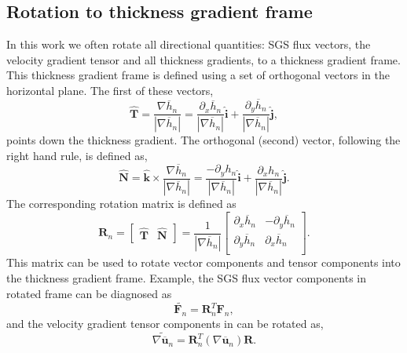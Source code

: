 \documentclass[draft,ms]{agutexSI2019}
\begin{document}
\begin{article}
\section{Rotation to thickness gradient frame}
\label{app:frame_rotate}
In this work we often rotate all directional quantities: SGS flux vectors, the velocity gradient tensor and all thickness gradients, to a thickness gradient frame. 
This thickness gradient frame is defined using a set of orthogonal vectors in the horizontal plane. The first of these vectors,
\begin{equation}
    \hat{\mathbf{T}} = \frac{\nabla \overline{h}_n}{|\nabla \overline{h}_n|} = \frac{\partial_x \overline{h}_n}{|\nabla \overline{h}_n|} \mathbf{\hat{i}} + \frac{\partial_y \overline{h}_n}{|\nabla \overline{h}_n|} \mathbf{\hat{j}},
\end{equation}
points down the thickness gradient. The orthogonal (second) vector, following the right hand rule, is defined as, 
\begin{equation}
    \hat{\mathbf{N}} = \mathbf{\hat{k}} \times \frac{\nabla \overline{h}_n}{|\nabla \overline{h}_n|} = \frac{-\partial_y h_n}{|\nabla \overline{h}_n|} \mathbf{\hat{i}} + \frac{\partial_x h_n}{|\nabla \overline{h}_n|} \mathbf{\hat{j}}.
\end{equation}
The corresponding rotation matrix is defined as
\begin{equation}
    \mathbf{R}_n = 
    \begin{bmatrix}
        \hat{\mathbf{T}} & \hat{\mathbf{N}}
    \end{bmatrix} = 
    \frac{1}{|\nabla \overline{h}_n|}
    \begin{bmatrix}
        \partial_x \overline{h}_n & - \partial_y \overline{h}_n \\
        \partial_y \overline{h}_n & \partial_x \overline{h}_n \\
    \end{bmatrix}.
\end{equation} 
This matrix can be used to rotate vector components and tensor components into the thickness gradient frame. Example, the SGS flux vector components in rotated frame can be diagnosed as 
\begin{equation}
    \widetilde{\mathbf{F}_n} = \mathbf{R}_n^T \mathbf{F}_n,
    \label{eqn:vec_rot}
\end{equation}
and the velocity gradient tensor components in  can be rotated as, 
\begin{equation}
    \widetilde{\nabla \overline{\mathbf{u}}_n} = \mathbf{R}_n^T (\nabla \overline{\mathbf{u}}_n) \mathbf{R}.
\end{equation}


\end{article}
\end{document}
